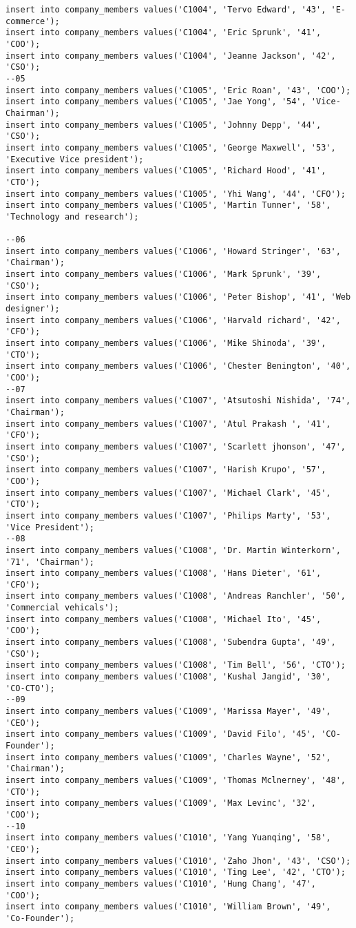 \documentclass[a4,12pt]{report}
\begin{document}
\begin{lstlisting}
insert into company_members values('C1004', 'Tervo Edward', '43', 'E-commerce');
insert into company_members values('C1004', 'Eric Sprunk', '41', 'COO');
insert into company_members values('C1004', 'Jeanne Jackson', '42', 'CSO');
--05
insert into company_members values('C1005', 'Eric Roan', '43', 'COO');
insert into company_members values('C1005', 'Jae Yong', '54', 'Vice-Chairman');
insert into company_members values('C1005', 'Johnny Depp', '44', 'CSO');
insert into company_members values('C1005', 'George Maxwell', '53', 'Executive Vice president');
insert into company_members values('C1005', 'Richard Hood', '41', 'CTO');
insert into company_members values('C1005', 'Yhi Wang', '44', 'CFO');
insert into company_members values('C1005', 'Martin Tunner', '58', 'Technology and research');

--06
insert into company_members values('C1006', 'Howard Stringer', '63', 'Chairman');
insert into company_members values('C1006', 'Mark Sprunk', '39', 'CSO');
insert into company_members values('C1006', 'Peter Bishop', '41', 'Web designer');
insert into company_members values('C1006', 'Harvald richard', '42', 'CFO');
insert into company_members values('C1006', 'Mike Shinoda', '39', 'CTO');
insert into company_members values('C1006', 'Chester Benington', '40', 'COO');
--07
insert into company_members values('C1007', 'Atsutoshi Nishida', '74', 'Chairman');
insert into company_members values('C1007', 'Atul Prakash ', '41', 'CFO');
insert into company_members values('C1007', 'Scarlett jhonson', '47', 'CSO');
insert into company_members values('C1007', 'Harish Krupo', '57', 'COO');
insert into company_members values('C1007', 'Michael Clark', '45', 'CTO');
insert into company_members values('C1007', 'Philips Marty', '53', 'Vice President');
--08
insert into company_members values('C1008', 'Dr. Martin Winterkorn', '71', 'Chairman');
insert into company_members values('C1008', 'Hans Dieter', '61', 'CFO');
insert into company_members values('C1008', 'Andreas Ranchler', '50', 'Commercial vehicals');
insert into company_members values('C1008', 'Michael Ito', '45', 'COO');
insert into company_members values('C1008', 'Subendra Gupta', '49', 'CSO');
insert into company_members values('C1008', 'Tim Bell', '56', 'CTO');
insert into company_members values('C1008', 'Kushal Jangid', '30', 'CO-CTO');
--09
insert into company_members values('C1009', 'Marissa Mayer', '49', 'CEO');
insert into company_members values('C1009', 'David Filo', '45', 'CO-Founder');
insert into company_members values('C1009', 'Charles Wayne', '52', 'Chairman');
insert into company_members values('C1009', 'Thomas Mclnerney', '48', 'CTO');
insert into company_members values('C1009', 'Max Levinc', '32', 'COO');
--10
insert into company_members values('C1010', 'Yang Yuanqing', '58', 'CEO');
insert into company_members values('C1010', 'Zaho Jhon', '43', 'CSO');
insert into company_members values('C1010', 'Ting Lee', '42', 'CTO');
insert into company_members values('C1010', 'Hung Chang', '47', 'COO');
insert into company_members values('C1010', 'William Brown', '49', 'Co-Founder');


\end{lstlisting}
\end{document}
